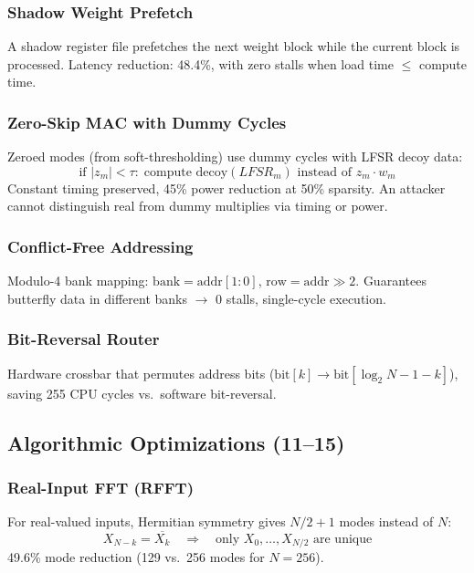 \documentclass[11pt,a4paper]{article}
\theoremstyle{definition}
\theoremstyle{remark}
\newcommand{\abs}[1]{\left\lvert#1\right\rvert}
\newcommand{\conj}[1]{\overline{#1}}
\begin{document}
\subsubsection{Shadow Weight Prefetch}
A shadow register file prefetches the next weight block while the current
block is processed. Latency reduction: 48.4\%, with zero stalls when load
time $\leq$ compute time.

\subsubsection{Zero-Skip MAC with Dummy Cycles}
Zeroed modes (from soft-thresholding) use dummy cycles with LFSR decoy data:
\begin{equation}
  \text{if } \abs{z_m} < \tau: \;\text{compute decoy}(LFSR_m) \text{ instead of } z_m \cdot w_m
\end{equation}
Constant timing preserved, 45\% power reduction at 50\% sparsity. An attacker
cannot distinguish real from dummy multiplies via timing or power.

\subsubsection{Conflict-Free Addressing}
Modulo-4 bank mapping: $\text{bank} = \text{addr}[1:0]$, $\text{row} = \text{addr} \gg 2$.
Guarantees butterfly data in different banks $\to$ 0 stalls, single-cycle execution.

\subsubsection{Bit-Reversal Router}
Hardware crossbar that permutes address bits ($\text{bit}[k] \to \text{bit}[\log_2 N - 1 - k]$),
saving 255 CPU cycles vs.\ software bit-reversal.

\subsection{Algorithmic Optimizations (11--15)}

\subsubsection{Real-Input FFT (RFFT)}
For real-valued inputs, Hermitian symmetry gives $N/2+1$ modes instead of $N$:
\begin{equation}
  X_{N-k} = \conj{X_k} \quad \Rightarrow \quad \text{only } X_0, \ldots, X_{N/2} \text{ are unique}
\end{equation}
49.6\% mode reduction (129 vs.\ 256 modes for $N=256$).
\end{document}
